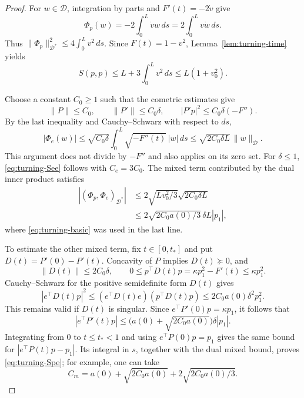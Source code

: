 \begin{proof}
For $w\in\mathcal D$, integration by parts and $F'(t)=-2\dot v$ give
\[
 \Phi_p(w)=-2\int_0^L\dot v w\,ds
          =2\int_0^L v\dot w\,ds.
\]
Thus $\|\Phi_p\|_{\mathcal D^*}^2\le4\int_0^L v^2\,ds$.
Since $F(t)=1-v^2$, Lemma~\ref{lem:turning-time} yields
\[
 S(p,p)\le L+3\int_0^L v^2\,ds\le L(1+v_0^2).
\]

Choose a constant $C_0\ge1$ such that the cometric estimates give
\[
 \|P\|\le C_0,\qquad \|P'\|\le C_0\delta,\qquad
 |P'p|^2\le C_0\delta(-F'').
\]
By the last inequality and Cauchy--Schwarz with respect to $ds$,
\[
 |\Phi_e(w)|
 \le\sqrt{C_0\delta}\int_0^L\sqrt{-F''(t)}\,|w|\,ds
 \le\sqrt{2C_0\delta L}\,\|w\|_{\mathcal D}.
\]
This argument does not divide by $-F''$ and also applies on its zero set.
For $\delta\le1$, \eqref{eq:turning-See} follows with $C_e=3C_0$.
The mixed term contributed by the dual inner product satisfies
\begin{align*}
 |(\Phi_p,\Phi_e)_{\mathcal D^*}|
 &\le 2\sqrt{Lv_0^2/3}\sqrt{2C_0\delta L}\\
 &\le 2\sqrt{2C_0a(0)/3}\,\delta L|p_1|,
\end{align*}
where \eqref{eq:turning-basic} was used in the last line.

To estimate the other mixed term, fix $t\in[0,t_*]$ and put
$D(t)=P'(0)-P'(t)$.  Concavity of $P$ implies $D(t)\succeq0$, and
\[
 \|D(t)\|\le2C_0\delta,\qquad
 0\le p^\top D(t)p=\kappa p_1^2-F'(t)\le\kappa p_1^2.
\]
Cauchy--Schwarz for the positive semidefinite form $D(t)$ gives
\[
 |e^\top D(t)p|^2
 \le(e^\top D(t)e)(p^\top D(t)p)
 \le2C_0a(0)\delta^2p_1^2.
\]
This remains valid if $D(t)$ is singular.  Since
$e^\top P'(0)p=\kappa p_1$, it follows that
\[
 |e^\top P'(t)p|
 \le\bigl(a(0)+\sqrt{2C_0a(0)}\bigr)\delta|p_1|.
\]
Integrating from $0$ to $t\le t_*<1$ and using $e^\top P(0)p=p_1$
gives the same bound for $|e^\top P(t)p-p_1|$.
Its integral in $s$, together with the dual mixed bound, proves
\eqref{eq:turning-Spe}; for example, one can take
\[
 C_m=a(0)+\sqrt{2C_0a(0)}+2\sqrt{2C_0a(0)/3}.
\]
\end{proof}

